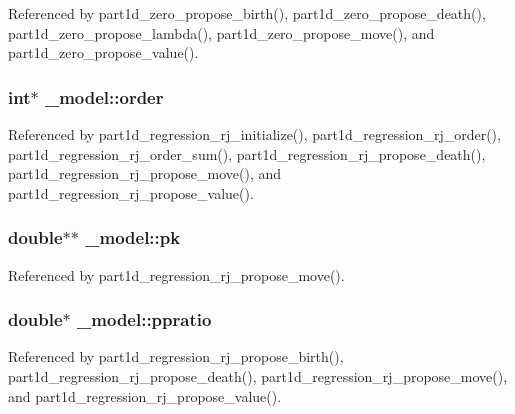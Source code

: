 Referenced by part1d\+\_\+zero\+\_\+propose\+\_\+birth(), part1d\+\_\+zero\+\_\+propose\+\_\+death(), part1d\+\_\+zero\+\_\+propose\+\_\+lambda(), part1d\+\_\+zero\+\_\+propose\+\_\+move(), and part1d\+\_\+zero\+\_\+propose\+\_\+value().

\subsubsection[{\texorpdfstring{order}{order}}]{\setlength{\rightskip}{0pt plus 5cm}int$\ast$ \+\_\+model\+::order}\hypertarget{struct__model_a8df0b9e6e7d2bced73cbdcab5e9bc5c1}{}\label{struct__model_a8df0b9e6e7d2bced73cbdcab5e9bc5c1}


Referenced by part1d\+\_\+regression\+\_\+rj\+\_\+initialize(), part1d\+\_\+regression\+\_\+rj\+\_\+order(), part1d\+\_\+regression\+\_\+rj\+\_\+order\+\_\+sum(), part1d\+\_\+regression\+\_\+rj\+\_\+propose\+\_\+death(), part1d\+\_\+regression\+\_\+rj\+\_\+propose\+\_\+move(), and part1d\+\_\+regression\+\_\+rj\+\_\+propose\+\_\+value().

\subsubsection[{\texorpdfstring{pk}{pk}}]{\setlength{\rightskip}{0pt plus 5cm}double$\ast$$\ast$ \+\_\+model\+::pk}\hypertarget{struct__model_a7d90fe9208e0f451f8068acdba5a9859}{}\label{struct__model_a7d90fe9208e0f451f8068acdba5a9859}


Referenced by part1d\+\_\+regression\+\_\+rj\+\_\+propose\+\_\+move().

\subsubsection[{\texorpdfstring{ppratio}{ppratio}}]{\setlength{\rightskip}{0pt plus 5cm}double$\ast$ \+\_\+model\+::ppratio}\hypertarget{struct__model_aa349c474c852ef9033606816eb1dd000}{}\label{struct__model_aa349c474c852ef9033606816eb1dd000}


Referenced by part1d\+\_\+regression\+\_\+rj\+\_\+propose\+\_\+birth(), part1d\+\_\+regression\+\_\+rj\+\_\+propose\+\_\+death(), part1d\+\_\+regression\+\_\+rj\+\_\+propose\+\_\+move(), and part1d\+\_\+regression\+\_\+rj\+\_\+propose\+\_\+value().

